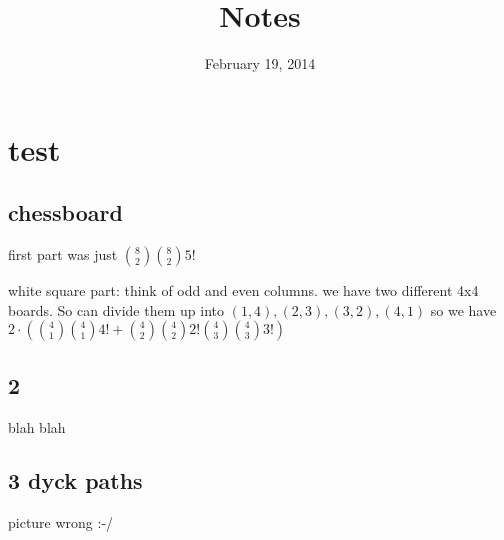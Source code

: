\documentclass{article}
\begin{document}
\title{Notes}
\date{February 19, 2014}
\maketitle
\section*{test}
\subsection*{chessboard}
first part was just $\binom{8}{2}\binom{8}{2}5!$

white square part: think of odd and even columns. we have two different 4x4 boards. So can divide them up into $(1,4),(2,3),(3,2),(4,1)$ so we have $2\cdot\left(\binom{4}{1}\binom{4}{1}4!+\binom{4}{2}\binom{4}{2}2!\binom{4}{3}\binom{4}{3}3!\right)$
\subsection*{2}
blah blah
\subsection*{3 dyck paths}
picture wrong :-/
\end{document}
